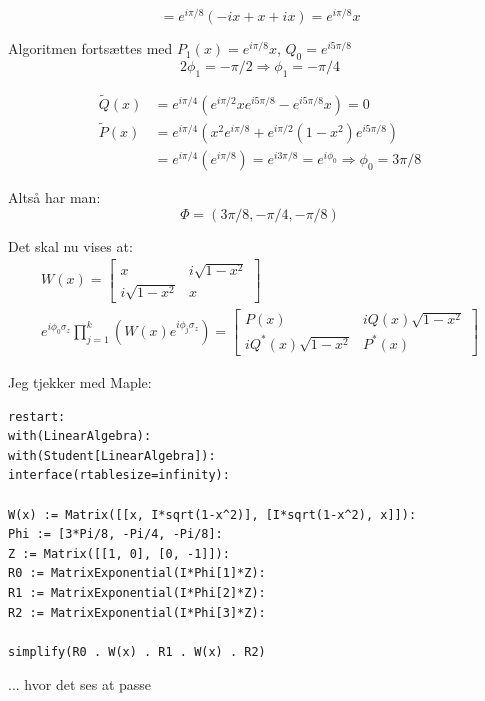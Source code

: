 \documentclass[11pt,a4paper]{article}
\begin{document}
\newpage

\[ = e^{i\pi/8} (-ix + x + ix) = e^{i\pi/8}x \]

Algoritmen fortsættes med $P_1(x) = e^{i\pi/8}x$, $Q_0 = e^{i5\pi/8}$
\
\[ 2\phi_1 = -\pi/2 \Rightarrow \phi_1 = -\pi/4 \]

\begin{align*}
    \tilde{Q}(x) &= e^{i\pi/4} (e^{i\pi/2} x e^{i5\pi/8} - e^{i5\pi/8}x) = 0 \\
    \tilde{P}(x) &= e^{i\pi/4} (x^2 e^{i\pi/8} + e^{i\pi/2}(1-x^2)e^{i5\pi/8}) \\
    &= e^{i\pi/4}(e^{i\pi/8}) = e^{i3\pi/8} = e^{i\phi_0} \Rightarrow \phi_0 = 3\pi/8
\end{align*}

Altså har man:
\[ \Phi = (3\pi/8, -\pi/4, -\pi/8) \]

Det skal nu vises at:
\begin{gather*}
    W(x) = \begin{bmatrix} x & i\sqrt{1-x^2} \\ i\sqrt{1-x^2} & x \end{bmatrix} \\
    e^{i\phi_0 \sigma_z} \prod_{j=1}^k (W(x) e^{i\phi_j \sigma_z}) = \begin{bmatrix} P(x) & iQ(x)\sqrt{1-x^2} \\ iQ^*(x)\sqrt{1-x^2} & P^*(x) \end{bmatrix}
\end{gather*}

Jeg tjekker med Maple:
\begin{lstlisting}[style=mystyle]
restart:
with(LinearAlgebra):
with(Student[LinearAlgebra]):
interface(rtablesize=infinity):

W(x) := Matrix([[x, I*sqrt(1-x^2)], [I*sqrt(1-x^2), x]]):
Phi := [3*Pi/8, -Pi/4, -Pi/8]:
Z := Matrix([[1, 0], [0, -1]]):
R0 := MatrixExponential(I*Phi[1]*Z):
R1 := MatrixExponential(I*Phi[2]*Z):
R2 := MatrixExponential(I*Phi[3]*Z):

simplify(R0 . W(x) . R1 . W(x) . R2)
\end{lstlisting}

\begin{center}
\end{center}
... hvor det ses at passe
\end{document}

